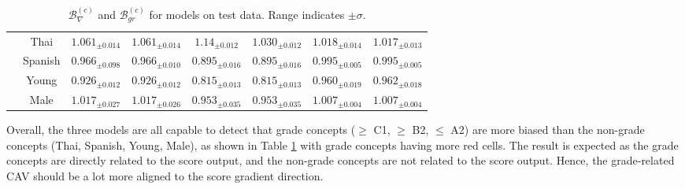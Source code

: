 \begin{table}[H]
\begin{tabular}{|c|c|cc|cc|cc|}
                                                                                 & Thai                              & \multicolumn{1}{c|}{$1.061_{\pm 0.014}$}                   & $1.061_{\pm 0.014}$                   & \multicolumn{1}{c|}{\cellcolor{red!15}$1.14_{\pm 0.012}$}  & $1.030_{\pm 0.012}$                   & \multicolumn{1}{c|}{$1.018_{\pm 0.014}$}                   & $1.017_{\pm 0.013}$                   \\
                                                                                 & Spanish                           & \multicolumn{1}{c|}{$0.966_{\pm 0.098}$}                   & $0.966_{\pm 0.010}$                   & \multicolumn{1}{c|}{\cellcolor{red!15}$0.895_{\pm 0.016}$} & \cellcolor{red!15}$0.895_{\pm 0.016}$ & \multicolumn{1}{c|}{$0.995_{\pm 0.005}$}                   & $0.995_{\pm 0.005}$                   \\ \cline{2-8}
                                                                                 & Young                             & \multicolumn{1}{c|}{$0.926_{\pm 0.012}$}                   & $0.926_{\pm 0.012}$                   & \multicolumn{1}{c|}{\cellcolor{red!15}$0.815_{\pm 0.013}$} & \cellcolor{red!15}$0.815_{\pm 0.013}$ & \multicolumn{1}{c|}{$0.960_{\pm 0.019}$}                   & $0.962_{\pm 0.018}$                   \\ \cline{2-8}
                                                                                 & Male                              & \multicolumn{1}{c|}{$1.017_{\pm 0.027}$}                   & $1.017_{\pm 0.026}$                   & \multicolumn{1}{c|}{$0.953_{\pm 0.035}$}                   & $0.953_{\pm 0.035}$                   & \multicolumn{1}{c|}{$1.007_{\pm 0.004}$}                   & $1.007_{\pm 0.004}$                   \\ \hline
    \end{tabular}
    \caption{$\mathcal{B}^{(c)}_{\nabla}$ and $\mathcal{B}^{(c)}_{gr}$ for models on test data. Range indicates $\pm \sigma$.}
    \label{tab:gradient_distance_combined}
\end{table}

Overall, the three models are all capable to detect that grade concepts ($\geq$ C1, $\geq$ B2, $\leq$ A2) are more biased than the non-grade concepts (Thai, Spanish, Young, Male), as shown in Table \ref{tab:gradient_distance_combined} with grade concepts having more red cells. The result is expected as the grade concepts are directly related to the score output, and the non-grade concepts are not related to the score output. Hence, the grade-related CAV should be a lot more aligned to the score gradient direction.

